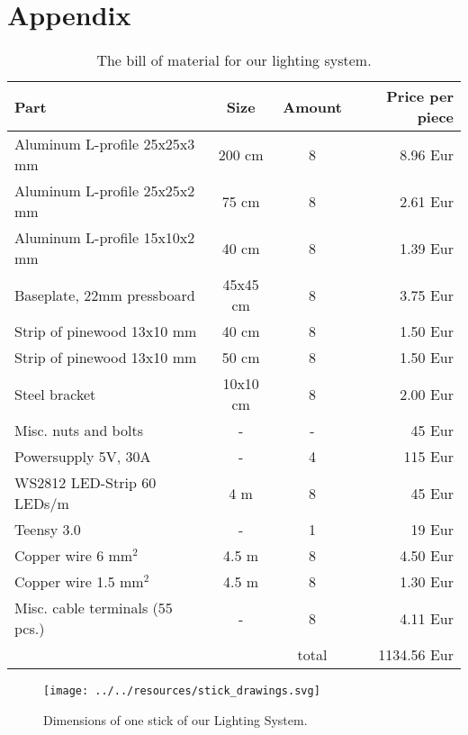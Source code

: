 \chapter{Appendix}
 \label{app:lightsystem}
 
 
    \begin{table}[H]
     \caption[Bill of material]{The bill of material for our lighting system.}
     \begin{tabular}{l|c|c|r}
        \toprule 
        {Part} & {Size} & {Amount} & {Price per piece} \\
        \midrule

    
 Aluminum L-profile 25x25x3 mm	& 200 cm & 8 &	 8.96 Eur \\
 Aluminum L-profile 25x25x2 mm &	 75 cm  & 8 &	 2.61 Eur \\
 Aluminum L-profile 15x10x2 mm &	  40 cm	& 8 & 1.39 Eur \\
 Baseplate, 22mm pressboard  &	 45x45 cm  &	 8 & 3.75 Eur \\
 Strip of pinewood 13x10 mm	 &  40 cm & 8 &	 1.50 Eur \\
 Strip of pinewood 13x10 mm	 &  50 cm & 8 &	 1.50 Eur \\
 Steel bracket & 10x10 cm & 8 & 2.00 Eur \\
 Misc. nuts and bolts &  - & - & 45 Eur \\
 Powersupply 5V, 30A & - & 4 & 115 Eur \\
 WS2812 LED-Strip 60 LEDs/m & 4 m & 8 & 45 Eur \\
 Teensy 3.0 \cite{TEENSY} & - & 1 & 19 Eur \\
 Copper wire 6 mm$^2$ & 4.5 m & 8 & 4.50 Eur \\
 Copper wire 1.5 mm$^2$ & 4.5 m & 8 & 1.30 Eur \\
 Misc. cable terminals (55 pcs.) & - & 8 & 4.11 Eur \\
 \hline

  & & total & 1134.56 Eur \\
 
        \bottomrule
     \end{tabular}
    \end{table}



  \begin{figure}[H]
   \center
   \texttt{[image: ../../resources/stick\_drawings.svg]}
   \caption[Technical drawing (lighting system)]{Dimensions of one stick of our Lighting System.}
   \label{fig:drawing_system}
  \end{figure}
